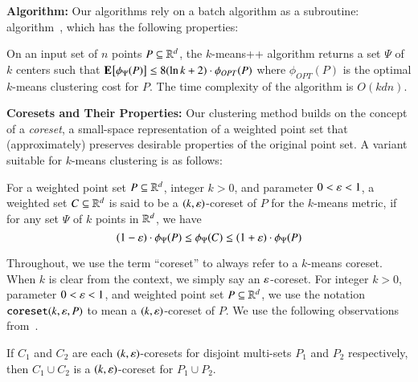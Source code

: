 \noindent\textbf{\kmpp Algorithm:}
Our algorithms rely on a batch algorithm as a subroutine: \kmpp algorithm~\cite{AV07}, 
which has the following properties:
\begin{theorem}
\label{theo:kmeans++}
On an input set of $n$ points $P \subseteq {\ensuremath{\mathbb{R}}}^d$, the $k$-means++ algorithm returns a set
$\Psi$ of $k$ centers such that $\mathop{\text{\normalfont \textbf{E}}}_{{}}\!\left[\phi_{\Psi}(P)\right] \le 8(\ln k + 2) \cdot \phi_{OPT}(P)$ where $\phi_{OPT}(P)$ is
the optimal $k$-means clustering cost for $P$. The time complexity of the
algorithm is $O(kdn)$.
\end{theorem}

\noindent\textbf{Coresets and Their Properties:}
Our clustering method builds on the concept of a \emph{coreset}, a small-space
representation of a weighted point set that (approximately) preserves desirable
properties of the original point set.  A variant suitable for $k$-means
clustering is as follows:
\begin{definition}
\label{defn:coreset}
For a weighted point set $P \subseteq {\ensuremath{\mathbb{R}}}^d$, integer $k > 0$, and parameter
$0 < \varepsilon < 1$, a weighted set $C \subseteq {\ensuremath{\mathbb{R}}}^d$ is said to be a
$(k, \varepsilon)$-coreset of $P$ for the $k$-means metric, if for any set $\Psi$
of $k$ points in ${\mathbb{R}}^d$, we have
\[(1-\varepsilon) \cdot \phi_{\Psi}(P) \le \phi_{\Psi}(C) \le (1+\varepsilon) \cdot \phi_{\Psi}(P)\]
\end{definition}

Throughout, we use the term ``coreset'' to always refer to a $k$-means coreset.
When $k$ is clear from the context, we simply say an $\varepsilon$-coreset.  For
integer $k > 0$, parameter $0 < \varepsilon < 1$, and weighted point set
$P \subseteq {\ensuremath{\mathbb{R}}}^d$, we use the notation $\texttt{coreset}(k, \varepsilon, P)$ to mean a
$(k,\varepsilon)$-coreset of $P$. We use the following observations from~\cite{HM04}.

\begin{observation}[\cite{HM04}]
\label{obs:coreset1}
If $C_1$ and $C_2$ are each $(k,\varepsilon)$-coresets for disjoint multi-sets $P_1$
and $P_2$ respectively, then $C_1 \cup C_2$ is a $(k, \varepsilon)$-coreset for
$P_1 \cup P_2$.
\end{observation}

